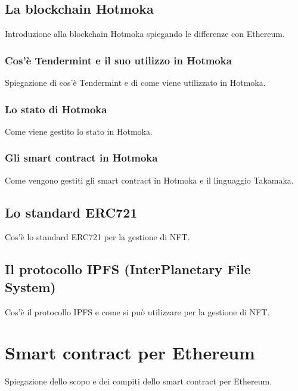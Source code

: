 \subsection{La blockchain Hotmoka}
Introduzione alla blockchain Hotmoka spiegando le differenze con Ethereum.

\subsubsection{Cos'è Tendermint e il suo utilizzo in Hotmoka}
Spiegazione di cos'è Tendermint e di come viene utilizzato in Hotmoka.

\subsubsection{Lo stato di Hotmoka}
Come viene gestito lo stato in Hotmoka.

\subsubsection{Gli smart contract in Hotmoka}
Come vengono gestiti gli smart contract in Hotmoka e il linguaggio Takamaka.

\subsection{Lo standard ERC721}
Cos'è lo standard ERC721 per la gestione di NFT.

\subsection{Il protocollo IPFS (InterPlanetary File System)}
Cos'è il protocollo IPFS e come si può utilizzare per la gestione di NFT.








\section{Smart contract per Ethereum}
Spiegazione dello scopo e dei compiti dello smart contract per Ethereum.

